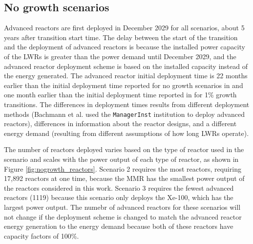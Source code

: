 \subsection{No growth scenarios} \label{sec:nogrowth_reactors}
Advanced reactors are first deployed in December 2029 for all scenarios, 
about 5 years after transition start time. The delay between the start of 
the transition and the deployment of advanced reactors is because the 
installed power capacity of the \glspl{LWR} is greater than the power demand
until December 2029, and the advanced reactor deployment scheme is based on 
the installed capacity instead of the energy generated.
The advanced reactor initial deployment time is 
22 months earlier than the initial deployment time reported for no growth 
scenarios in 
\cite{bachmann_enrichment_2021} and one month earlier than the 
initial deployment time reported in \cite{bachmann_enrichment_2021}
for 1\% growth transitions. The differences in deployment times results 
from different deployment methods (Bachmann et al. used the \Cycamore 
\texttt{ManagerInst} institution to deploy advanced reactors), differences 
in information about the reactor designs, and a different energy demand 
(resulting from different assumptions of how long \glspl{LWR} operate). 

The number of reactors deployed varies based on 
the type of reactor used in the scenario and scales with the power output of 
each type of reactor, as shown in Figure \ref{fig:nogrowth_reactors}. Scenario
2 requires the most reactors, requiring 17,892 reactors at one time, 
because the \gls{MMR} has the smallest power output of the reactors 
considered in this work. Scenario 3 requires the fewest 
advanced reactors (1119) because this scenario only deploys the Xe-100,
which has the largest power output. The numebr of advanced reactors for 
these scenarios will not change if the deployment scheme is changed to 
match the advanced reactor energy generation to the energy demand because 
both of these reactors have capacity factors of 100\%. 

